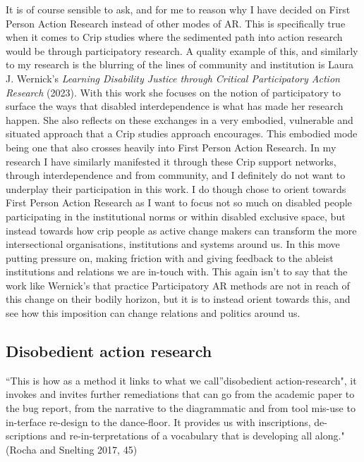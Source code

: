 It is of course sensible to ask, and for me to reason why I have decided
on First Person Action Research instead of other modes of AR. This is
specifically true when it comes to Crip studies where the sedimented
path into action research would be through participatory research. A
quality example of this, and similarly to my research is the blurring of
the lines of community and institution is Laura J. Wernick's
\emph{Learning Disability Justice through Critical Participatory Action
Research} (2023). With this work she focuses on the notion of
participatory to surface the ways that disabled interdependence is what
has made her research happen. She also reflects on these exchanges in a
very embodied, vulnerable and situated approach that a Crip studies
approach encourages. This embodied mode being one that also crosses
heavily into First Person Action Research. In my research I have
similarly manifested it through these Crip support networks, through
interdependence and from community, and I definitely do not want to
underplay their participation in this work. I do though chose to orient
towards First Person Action Research as I want to focus not so much on
disabled people participating in the institutional norms or within
disabled exclusive space, but instead towards how crip people as active
change makers can transform the more intersectional organisations,
institutions and systems around us. In this move putting pressure on,
making friction with and giving feedback to the ableist institutions and
relations we are in-touch with. This again isn't to say that the work
like Wernick's that practice Participatory AR methods are not in reach
of this change on their bodily horizon, but it is to instead orient
towards this, and see how this imposition can change relations and
politics around us.

\hypertarget{disobedient-action-research}{%
\subsection[Disobedient action
research]{\texorpdfstring{\protect\hypertarget{anchor}{}{}Disobedient
action
research}{Disobedient action research}}\label{disobedient-action-research}}

``This is how as a method it links to what we call''disobedient
action-research", it invokes and invites further remediations that can
go from the academic paper to the bug report, from the narrative to the
diagrammatic and from tool mis-use to in-terface re-design to the
dance-floor. It provides us with inscriptions, de-scriptions and
re-in-terpretations of a vocabulary that is developing all along."
(Rocha and Snelting 2017, 45)

